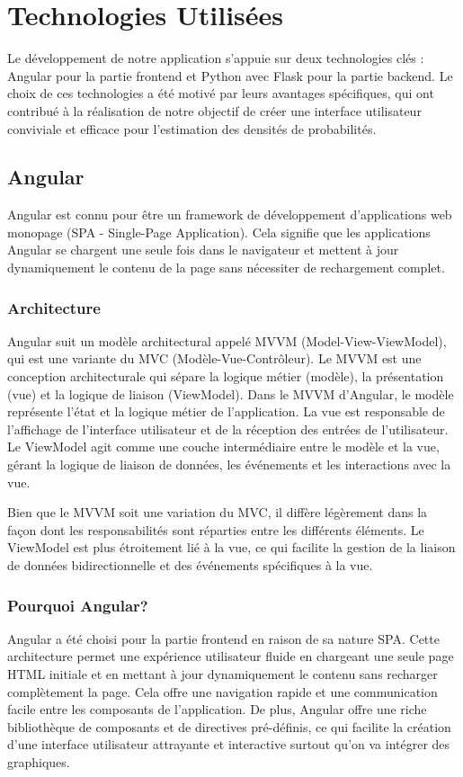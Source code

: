 \section{Technologies Utilisées}
Le développement de notre application s'appuie sur deux technologies clés : Angular pour la partie frontend et Python avec Flask pour la partie backend. Le choix de ces technologies a été motivé par leurs avantages spécifiques, qui ont contribué à la réalisation de notre objectif de créer une interface utilisateur conviviale et efficace pour l'estimation des densités de probabilités.
\subsection{Angular}
Angular est  connu pour être un framework de développement d'applications web monopage (SPA - Single-Page Application). Cela signifie que les applications Angular se chargent une seule fois dans le navigateur et mettent à jour dynamiquement le contenu de la page sans nécessiter de rechargement complet.
\subsubsection{Architecture}
Angular suit un modèle architectural appelé MVVM (Model-View-ViewModel), qui est une variante du MVC (Modèle-Vue-Contrôleur). Le MVVM est une conception architecturale qui sépare la logique métier (modèle), la présentation (vue) et la logique de liaison (ViewModel). Dans le MVVM d'Angular, le modèle représente l'état et la logique métier de l'application. La vue est responsable de l'affichage de l'interface utilisateur et de la réception des entrées de l'utilisateur. Le ViewModel agit comme une couche intermédiaire entre le modèle et la vue, gérant la logique de liaison de données, les événements et les interactions avec la vue.

Bien que le MVVM soit une variation du MVC, il diffère légèrement dans la façon dont les responsabilités sont réparties entre les différents éléments. Le ViewModel est plus étroitement lié à la vue, ce qui facilite la gestion de la liaison de données bidirectionnelle et des événements spécifiques à la vue.
\subsubsection{Pourquoi Angular?}
Angular a été choisi pour la partie frontend en raison de sa nature SPA. Cette architecture permet une expérience utilisateur fluide en chargeant une seule page HTML initiale et en mettant à jour dynamiquement le contenu sans recharger complètement la page. Cela offre une navigation rapide et une communication facile entre les composants de l'application. De plus, Angular offre une riche bibliothèque de composants et de directives pré-définis, ce qui facilite la création d'une interface utilisateur attrayante et interactive surtout qu'on va intégrer des graphiques.

